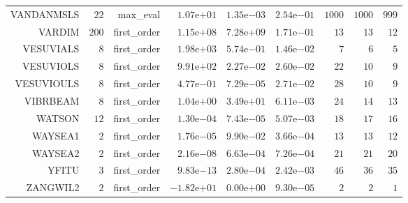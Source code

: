 \begin{longtable}{rrrrrrrrr}
VANDANMSLS & \(    22\) & max\_eval & \( 1.07\)e\(+01\) & \( 1.35\)e\(-03\) & \( 2.54\)e\(-01\) & \(  1000\) & \(  1000\) & \(   999\) \\
VARDIM & \(   200\) & first\_order & \( 1.15\)e\(+08\) & \( 7.28\)e\(+09\) & \( 1.71\)e\(-01\) & \(    13\) & \(    13\) & \(    12\) \\
VESUVIALS & \(     8\) & first\_order & \( 1.98\)e\(+03\) & \( 5.74\)e\(-01\) & \( 1.46\)e\(-02\) & \(     7\) & \(     6\) & \(     5\) \\
VESUVIOLS & \(     8\) & first\_order & \( 9.91\)e\(+02\) & \( 2.27\)e\(-02\) & \( 2.60\)e\(-02\) & \(    22\) & \(    10\) & \(     9\) \\
VESUVIOULS & \(     8\) & first\_order & \( 4.77\)e\(-01\) & \( 7.29\)e\(-05\) & \( 2.71\)e\(-02\) & \(    28\) & \(    10\) & \(     9\) \\
VIBRBEAM & \(     8\) & first\_order & \( 1.04\)e\(+00\) & \( 3.49\)e\(+01\) & \( 6.11\)e\(-03\) & \(    24\) & \(    14\) & \(    13\) \\
WATSON & \(    12\) & first\_order & \( 1.30\)e\(-04\) & \( 7.43\)e\(-05\) & \( 5.07\)e\(-03\) & \(    18\) & \(    17\) & \(    16\) \\
WAYSEA1 & \(     2\) & first\_order & \( 1.76\)e\(-05\) & \( 9.90\)e\(-02\) & \( 3.66\)e\(-04\) & \(    13\) & \(    13\) & \(    12\) \\
WAYSEA2 & \(     2\) & first\_order & \( 2.16\)e\(-08\) & \( 6.63\)e\(-04\) & \( 7.26\)e\(-04\) & \(    21\) & \(    21\) & \(    20\) \\
YFITU & \(     3\) & first\_order & \( 9.83\)e\(-13\) & \( 2.80\)e\(-04\) & \( 2.42\)e\(-03\) & \(    46\) & \(    36\) & \(    35\) \\
ZANGWIL2 & \(     2\) & first\_order & \(-1.82\)e\(+01\) & \( 0.00\)e\(+00\) & \( 9.30\)e\(-05\) & \(     2\) & \(     2\) & \(     1\) \\\hline
\end{longtable}
